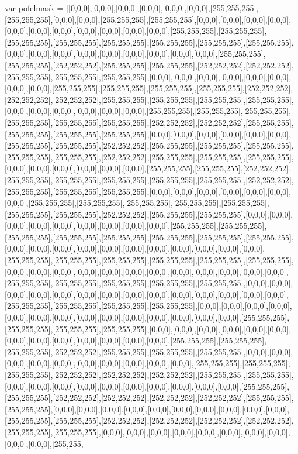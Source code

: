 var pofelmask = [[0,0,0],[0,0,0],[0,0,0],[0,0,0],[0,0,0],[0,0,0],[255,255,255],[255,255,255],[0,0,0],[0,0,0],[255,255,255],[255,255,255],[0,0,0],[0,0,0],[0,0,0],[0,0,0],[0,0,0],[0,0,0],[0,0,0],[0,0,0],[0,0,0],[0,0,0],[0,0,0],[255,255,255],[255,255,255],[255,255,255],[255,255,255],[255,255,255],[255,255,255],[255,255,255],[255,255,255],[0,0,0],[0,0,0],[0,0,0],[0,0,0],[0,0,0],[0,0,0],[0,0,0],[0,0,0],[0,0,0],[255,255,255],[255,255,255],[252,252,252],[255,255,255],[255,255,255],[252,252,252],[252,252,252],[255,255,255],[255,255,255],[255,255,255],[0,0,0],[0,0,0],[0,0,0],[0,0,0],[0,0,0],[0,0,0],[0,0,0],[0,0,0],[255,255,255],[255,255,255],[255,255,255],[255,255,255],[252,252,252],[252,252,252],[252,252,252],[255,255,255],[255,255,255],[255,255,255],[255,255,255],[0,0,0],[0,0,0],[0,0,0],[0,0,0],[0,0,0],[0,0,0],[255,255,255],[255,255,255],[255,255,255],[255,255,255],[255,255,255],[255,255,255],[252,252,252],[252,252,252],[255,255,255],[255,255,255],[255,255,255],[255,255,255],[0,0,0],[0,0,0],[0,0,0],[0,0,0],[0,0,0],[0,0,0],[255,255,255],[255,255,255],[252,252,252],[255,255,255],[255,255,255],[255,255,255],[255,255,255],[255,255,255],[252,252,252],[255,255,255],[255,255,255],[255,255,255],[0,0,0],[0,0,0],[0,0,0],[0,0,0],[0,0,0],[0,0,0],[255,255,255],[255,255,255],[252,252,252],[255,255,255],[255,255,255],[255,255,255],[255,255,255],[255,255,255],[252,252,252],[255,255,255],[255,255,255],[255,255,255],[0,0,0],[0,0,0],[0,0,0],[0,0,0],[0,0,0],[0,0,0],[0,0,0],[255,255,255],[255,255,255],[255,255,255],[255,255,255],[255,255,255],[255,255,255],[255,255,255],[252,252,252],[255,255,255],[255,255,255],[0,0,0],[0,0,0],[0,0,0],[0,0,0],[0,0,0],[0,0,0],[0,0,0],[0,0,0],[0,0,0],[255,255,255],[255,255,255],[255,255,255],[255,255,255],[255,255,255],[255,255,255],[255,255,255],[255,255,255],[0,0,0],[0,0,0],[0,0,0],[0,0,0],[0,0,0],[0,0,0],[0,0,0],[0,0,0],[0,0,0],[0,0,0],[0,0,0],[255,255,255],[255,255,255],[255,255,255],[255,255,255],[255,255,255],[255,255,255],[0,0,0],[0,0,0],[0,0,0],[0,0,0],[0,0,0],[0,0,0],[0,0,0],[0,0,0],[0,0,0],[0,0,0],[0,0,0],[0,0,0],[255,255,255],[255,255,255],[255,255,255],[255,255,255],[255,255,255],[0,0,0],[0,0,0],[0,0,0],[0,0,0],[0,0,0],[0,0,0],[0,0,0],[0,0,0],[0,0,0],[0,0,0],[0,0,0],[0,0,0],[0,0,0],[0,0,0],[255,255,255],[255,255,255],[255,255,255],[255,255,255],[0,0,0],[0,0,0],[0,0,0],[0,0,0],[0,0,0],[0,0,0],[0,0,0],[0,0,0],[0,0,0],[0,0,0],[0,0,0],[0,0,0],[0,0,0],[0,0,0],[255,255,255],[255,255,255],[255,255,255],[255,255,255],[0,0,0],[0,0,0],[0,0,0],[0,0,0],[0,0,0],[0,0,0],[0,0,0],[0,0,0],[0,0,0],[0,0,0],[0,0,0],[0,0,0],[0,0,0],[255,255,255],[255,255,255],[255,255,255],[252,252,252],[255,255,255],[255,255,255],[255,255,255],[0,0,0],[0,0,0],[0,0,0],[0,0,0],[0,0,0],[0,0,0],[0,0,0],[0,0,0],[0,0,0],[0,0,0],[255,255,255],[255,255,255],[255,255,255],[252,252,252],[252,252,252],[252,252,252],[255,255,255],[255,255,255],[0,0,0],[0,0,0],[0,0,0],[0,0,0],[0,0,0],[0,0,0],[0,0,0],[0,0,0],[0,0,0],[0,0,0],[255,255,255],[255,255,255],[252,252,252],[252,252,252],[252,252,252],[252,252,252],[255,255,255],[255,255,255],[0,0,0],[0,0,0],[0,0,0],[0,0,0],[0,0,0],[0,0,0],[0,0,0],[0,0,0],[0,0,0],[0,0,0],[255,255,255],[255,255,255],[252,252,252],[252,252,252],[252,252,252],[252,252,252],[255,255,255],[255,255,255],[0,0,0],[0,0,0],[0,0,0],[0,0,0],[0,0,0],[0,0,0],[0,0,0],[0,0,0],[0,0,0],[0,0,0],[255,255,